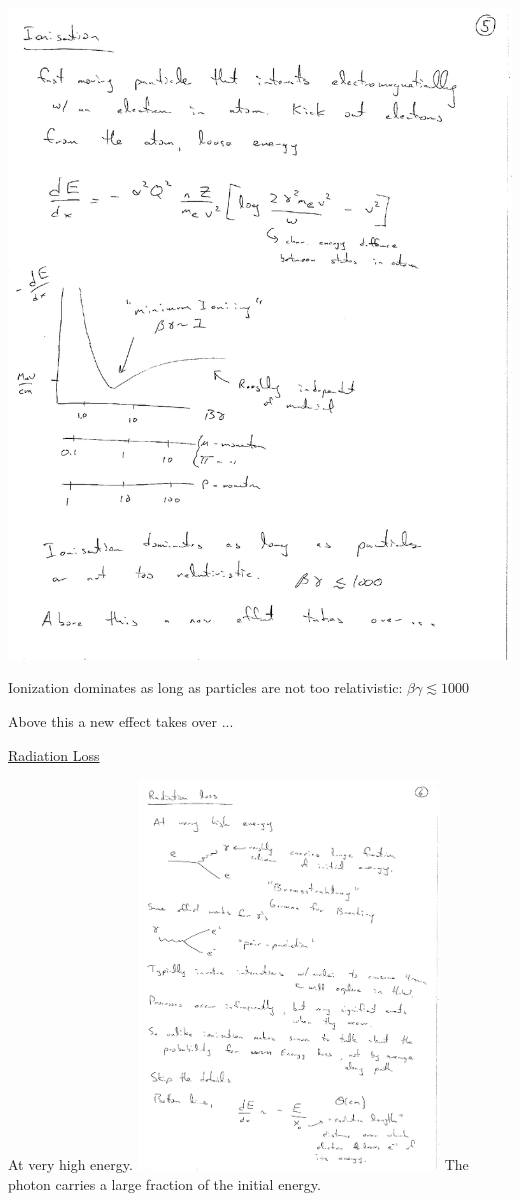 {\bc
\includegraphics[width=\textwidth]{./DeDx.pdf}
\ec

Ionization dominates as long as particles are not too relativistic: $\beta\gamma \lesssim 1000 $

Above this a new effect takes over ... 

\clearpage

\lineacross

\underline{Radiation Loss}

At very high energy.
\bc
\includegraphics[width=0.6\textwidth]{./Brem.pdf}
\ec
The photon carries a large fraction of the initial energy.

}
